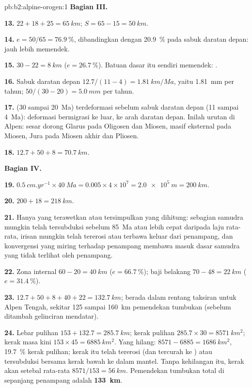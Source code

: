 \begin{solution}{pb:b2:alpine-orogen:1}
\noindent\textbf{Bagian III.}

\textbf{13.} $22 + 18 + 25 = \qty{65}{km}$; $S = 65 - 15 = \qty{50}{km}$.

\textbf{14.} $e = 50/65 = \qty{76.9}{\percent}$, dibandingkan dengan \qty{20.9}{\percent} pada
sabuk daratan depan:  jauh lebih memendek.

\textbf{15.} $30 - 22 = \qty{8}{km}$ ($e = \qty{26.7}{\percent}$). Batuan dasar itu sendiri
memendek: .

\textbf{16.} Sabuk daratan depan $12.7/(11 - 4) = \qty{1.81}{km/Ma}$, yaitu
\qty{1.81}{mm} per tahun;  $50/(30 - 20) = \qty{5.0}{mm}$ per tahun.

\textbf{17.}  (30 sampai \qty{20}{Ma}) terdeformasi sebelum sabuk daratan depan (11 sampai
\qty{4}{Ma}): deformasi bermigrasi ke luar, ke arah daratan depan. Inilah urutan di
Alpen: sesar dorong Glarus pada Oligosen dan Miosen, masif eksternal pada Miosen,
Jura pada Miosen akhir dan Pliosen.

\textbf{18.} $12.7 + 50 + 8 = \qty{70.7}{km}$.

\noindent\textbf{Bagian IV.}

\textbf{19.} $\qty{0.5}{cm.yr^{-1}}\times\qty{40}{Ma} = 0.005\times4\times10^7 =
\qty{2.0e5}{m} = \qty{200}{km}$.

\textbf{20.} $200 + 18 = \qty{218}{km}$.

\textbf{21.} Hanya yang terawetkan atau tersimpulkan yang dihitung: sebagian samudra mungkin telah
tersubduksi sebelum \qty{85}{Ma} atau lebih cepat daripada laju rata-rata, irisan  mungkin telah
tererosi atau terbawa keluar dari penampang, dan konvergensi yang miring terhadap penampang membawa
masuk dasar samudra yang tidak terlihat oleh penampang.

\textbf{22.} Zona internal $60 - 20 = \qty{40}{km}$ ($e = \qty{66.7}{\percent}$); baji belakang
$70 - 48 = \qty{22}{km}$ ($e = \qty{31.4}{\percent}$).

\textbf{23.} $12.7 + 50 + 8 + 40 + 22 = \qty{132.7}{km}$; berada dalam rentang taksiran
untuk Alpen Tengah, sekitar 125 sampai \qty{160}{km} pemendekan tumbukan (sebelum ditambah
gelinciran mendatar).

\textbf{24.} Lebar pulihan $153 + 132.7 = \qty{285.7}{km}$; kerak pulihan
$285.7\times30 = \qty{8571}{km^2}$; kerak masa kini $153\times45 = \qty{6885}{km^2}$. Yang hilang:
$8571 - 6885 = \qty{1686}{km^2}$, \qty{19.7}{\percent} kerak pulihan; kerak itu telah
tererosi (dan tercurah ke ) atau tersubduksi bersama kerak bawah ke dalam
mantel. Tanpa kehilangan itu, kerak akan setebal rata-rata $8571/153 = \qty{56}{km}$.
Pemendekan tumbukan total di sepanjang penampang adalah
\textbf{\qty[text-series-to-math=true]{133}{km}}.
\end{solution}
